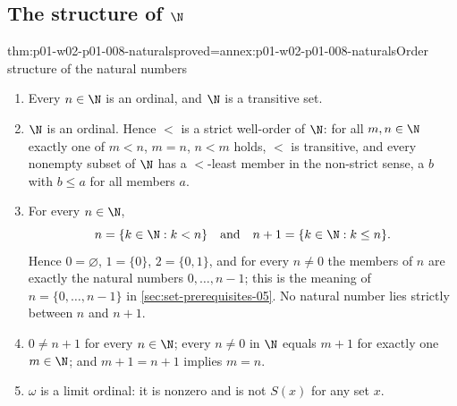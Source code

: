 \subsection{The structure of \(\N\)}
\label{sec:p01-w02-p01-008-structure}

\begin{hbtheorem}{thm:p01-w02-p01-008-naturals}{proved=annex:p01-w02-p01-008-naturals}{Order structure of the natural numbers}
\begin{enumerate}
  \item Every \(n\in\N\) is an ordinal, and \(\N\) is a transitive set.
  \item \(\N\) is an ordinal. Hence \(<\) is a strict well-order of \(\N\):
        for all \(m,n\in\N\) exactly one of \(m<n\), \(m=n\), \(n<m\) holds,
        \(<\) is transitive, and every nonempty subset of \(\N\) has a
        \(<\)-least member in the non-strict sense, a \(b\) with
        \(b\leq a\) for all members \(a\).
  \item For every \(n\in\N\),
        \[
          n=\{k\in\N:k<n\}\quad\text{and}\quad
          n+1=\{k\in\N:k\leq n\}.
        \]
        Hence \(0=\varnothing\), \(1=\{0\}\), \(2=\{0,1\}\), and for every
        \(n\neq0\) the members of \(n\) are exactly the natural numbers
        \(0,\ldots,n-1\); this is the meaning of \(n=\{0,\ldots,n-1\}\) in
        \cref{sec:set-prerequisites-05}. No natural number lies strictly
        between \(n\) and \(n+1\).
  \item \(0\neq n+1\) for every \(n\in\N\); every \(n\neq0\) in \(\N\) equals
        \(m+1\) for exactly one \(m\in\N\); and \(m+1=n+1\) implies \(m=n\).
  \item \(\omega\) is a limit ordinal: it is nonzero and is not \(S(x)\) for
        any set \(x\).
\end{enumerate}
\end{hbtheorem}

